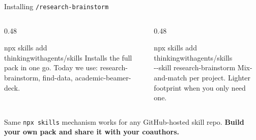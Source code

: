 \documentclass[aspectratio=169, 10pt]{beamer}
\begin{document}
\begin{frame}[fragile]{Installing \texttt{/research-brainstorm}}
\begin{columns}[T]
\begin{column}{0.48\textwidth}
\begin{tcolorbox}[keybox, title={\faCubes\quad Full economist pack}]
\scriptsize
{\tiny\ttfamily npx skills add\\\hspace*{1em}thinkingwithagents/skills}
\vskip4pt
Installs the full pack in one go. Today we use: {\fontsize{6.5}{8}\selectfont\ttfamily research-brainstorm, find-data, academic-beamer-deck.}
\end{tcolorbox}
\end{column}
\begin{column}{0.48\textwidth}
\begin{tcolorbox}[keybox, title={\faPuzzlePiece\quad One skill at a time}]
\scriptsize
{\tiny\ttfamily npx skills add\\\hspace*{1em}thinkingwithagents/skills\\\hspace*{1em}-{}-skill research-brainstorm}
\vskip4pt
Mix-and-match per project. Lighter footprint when you only need one.
\end{tcolorbox}
\end{column}
\end{columns}
\vskip6pt
\pause
\begin{tcolorbox}[accentbox, width=12cm, halign=center, top=3pt, bottom=3pt]
\scriptsize Same \texttt{npx skills} mechanism works for any GitHub-hosted skill repo. \textbf{Build your own pack and share it with your coauthors.}
\end{tcolorbox}
\end{frame}
\end{document}
